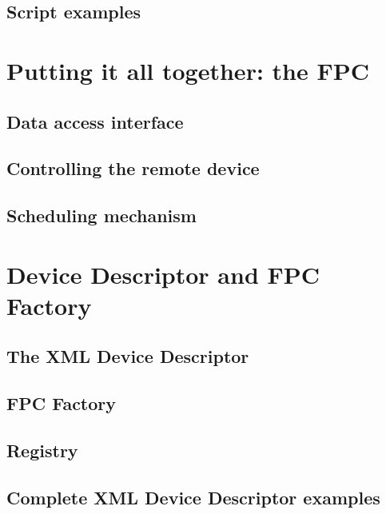 \subsection{Script examples}


\section{Putting it all together: the FPC}

\subsection{Data access interface}

\subsection{Controlling the remote device}

\subsection{Scheduling mechanism}


\section{Device Descriptor and FPC Factory}

\subsection{The XML Device Descriptor}

\subsection{FPC Factory}

\subsection{Registry}

\subsection{Complete XML Device Descriptor examples}